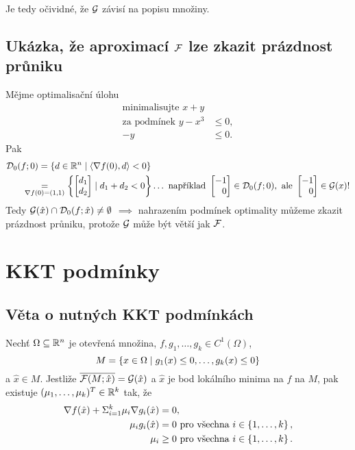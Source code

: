 Je tedy očividné, že $\mathcal{G}$ závisí na popisu množiny.

\subsection{Ukázka, že aproximací \texorpdfstring{$\mathcal{F}$}{F} lze zkazit prázdnost průniku}
Mějme optimalisační úlohu
\begin{align*}
    \text{minimalisujte } x + y \\
    \text{za podmínek } y - x^3 &\leq 0, \\
     - y &\leq 0.
\end{align*}
Pak
\begin{align*}
    \mathcal{D}_0(f; 0) &= \left\lbrace d \in \mathbb{R}^n \mid \langle \nabla f(0), d\rangle < 0 \right\rbrace \\
    &\hspace*{-1.8em}\underset{\nabla f(0) = (1, 1)}{=} \left\lbrace 
    \begin{bmatrix}
        d_1 \\
        d_2
    \end{bmatrix} \mid d_1 + d_2 < 0 \right\rbrace \dots \text{ například } 
    \begin{bmatrix}
        -1 \\
        \phantom{-}0
    \end{bmatrix} \in \mathcal{D}_0(f; 0), \text{ ale } 
    \begin{bmatrix}
        -1 \\
        \phantom{-}0
    \end{bmatrix} \in \mathcal{G}(x)!
\end{align*}
Tedy $\mathcal{G}(\hat x) \cap \mathcal{D}_0(f; \hat x) \not= \emptyset$ $\implies$ nahrazením podmínek optimality můžeme zkazit prázdnost 
průniku, protože $\mathcal{G}$ může být větší jak $\mathcal{F}$.
\newpage
\section{KKT podmínky}
\subsection{Věta o nutných KKT podmínkách}\label{KKT}
Nechť $\Omega \subseteq \mathbb{R}^n$ je otevřená množina, $f, g_1, \dots, g_k \in C^1 (\Omega)$,
\[
    M = \left\lbrace x \in \Omega \mid g_1(x) \leq 0, \dots, g_k(x) \leq 0 \right\rbrace
\]
a $\hat x \in M$. Jestliže $\overline{\mathcal{F}(M; \hat x)} = \mathcal{G}(\hat x)$ a $\hat x$ je bod lokálního minima na $f$ na $M$, 
pak existuje ${(\mu_1, \dots, \mu_k)^T \in \mathbb{R}^k}$ tak, že 
\begin{align*}
    \nabla f(\hat x) + \Sigma_{i=1}^k \mu_i \nabla g_i(\hat x) &= 0, \\
    \mu_i g_i(\hat x) &= 0 \text{ pro všechna } i \in \left\lbrace 1, \dots, k \right\rbrace, \\
    \mu_i &\geq 0 \text{ pro všechna } i \in \left\lbrace 1, \dots, k \right\rbrace.
\end{align*}

